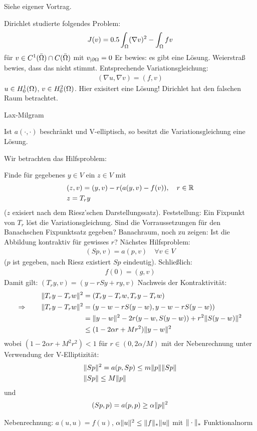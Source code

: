 \begin{beweis}
  Siehe eigener Vortrag.
\end{beweis}
Dirichlet studierte folgendes Problem: 
\begin{align*}
  J(v) = 0.5 \int_\Omega (\nabla v)^2 - \int_\Omega f v
\end{align*}
für $v \in C^1(\bar {\Omega}) \cap C(\bar {\Omega})$ mit $v_{| \partial \Omega } = 0$
Er bewies: es gibt eine Lösung. Weierstraß bewies, dass das nicht stimmt. Entsprechende Variationsgleichung:
\begin{align*}
  (\nabla u, \nabla v) = (f, v)
\end{align*}
$u \in H_0^1(\Omega)$, $v \in H^2_0 (\Omega)$. Hier exisitert eine Lösung! Dirichlet hat den falschen Raum betrachtet.
\begin{lemma} Lax-Milgram
  
Ist $a(\cdot, \cdot)$ beschränkt und V-elliptisch, so besitzt die Variationsgleichung eine Lösung.
\end{lemma}
\begin{beweis} 
  Wir betrachten das Hilfsproblem:

Finde für gegebenes $y \in V$ ein $z \in V$ mit 
\begin{align*}
  &  (z,v) = (y, v) - r(a(y, v)-f(v)), \quad r \in \mathbb{R}\\
  &  z = T_r y
\end{align*}
($z$ exisiert nach dem Riesz'schen Darstellungssatz). Feststellung: Ein Fixpunkt von $T_r$ löst die Variationsgleichung. Sind die Vorraussetzungen für den Banachschen Fixpunktsatz gegeben? Banachraum, noch zu zeigen: Ist die Abbildung kontraktiv für gewisses $r$? Nächstes Hilfsproblem: 
\begin{align*}
  (Sp, v) = a(p, v) \quad \forall v \in V
\end{align*}
($p$ ist gegeben, nach Riesz existiert $Sp$ eindeutig). Schließlich:
\begin{align*}
  f(0) = (g, v)
\end{align*}
Damit gilt: $(T_ry, v) = (y -r Sy + ry, v)$ 
Nachweis der Kontraktivität:
\begin{align*}
  \|T_r y - T_r w \|^2 &= (T_r y - T_r w, T_r y -T_r w)\\
\Rightarrow \qquad \|T_r y - T_r w\|^2 &= (y-w-rS(y-w), y-w-rS(y-w))\\
&= \|y-w\|^2 - 2r(y-w, S(y-w)) + r^2  \|S(y-w)\|^2\\
& \leq (1- 2 \alpha r+ Mr^2)\|y-w\|^2 
\end{align*}
wobei $(1- 2 \alpha r+ M^2r^2)<1$ für $r \in (0, 2 \alpha/M) $ 
mit der Nebenrechnung unter Verwendung der V-Elliptizität:
\begin{align*}
&  \|Sp\|^2 = a(p, Sp)\leq m \|p \| \|Sp\|\\
& \|Sp\| \leq M \|p\|
\end{align*}
und
\begin{align*}
  (Sp, p) = a(p,p) \geq \alpha \|p\|^2
\end{align*}
\end{beweis}
Nebenrechnung:
$a (u,u) = f(u)$, $\alpha \|u\|^2 \leq \|f\|_* \|u\|$
mit $\|\cdot\|_*$ Funktionalnorm
